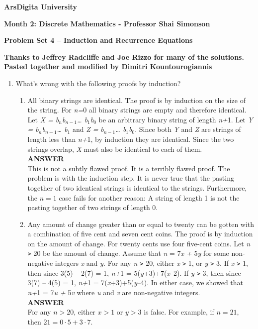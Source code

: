 \documentclass{article}
\begin{document}
\begin{center}
\textbf{ArsDigita University}

\textbf{Month 2: Discrete Mathematics - Professor Shai Simonson}

\textbf{Problem Set 4 -- Induction and Recurrence Equations}

\textbf{Thanks to Jeffrey Radcliffe and Joe Rizzo for many of the
solutions.\\
Pasted together and modified by Dimitri Kountourogiannis}

\end{center}

\begin{enumerate}
\item
What's wrong with the following proofs by induction?

\begin{enumerate}
\item
All binary strings are identical. The proof is by induction on the
size of the string. For \textit{n=}0 all binary strings are empty
and therefore identical. Let \textit{X =
b}$_{\mathit{n}}$\textit{b}$_{\mathit{n-1}}$\textit{\dots
b}$_{\mathit{1}}$\textit{b}$_{\mathit{0}}$ be an arbitrary binary
string of length \textit{n+}1. Let \textit{Y =
b}$_{\mathit{n}}$\textit{b}$_{\mathit{n-1}}$\textit{\dots
b}$_{\mathit{1}}$ and \textit{Z =}
\textit{b}$_{\mathit{n-1}}$\textit{\dots
b}$_{\mathit{1}}$\textit{b}$_{\mathit{0}}$. Since both \textit{Y}
and \textit{Z} are strings of length less than \textit{n+}1, by
induction they are identical. Since the two strings overlap,
\textit{X} must also be identical to each of them. \\
\textbf{ANSWER} \\
 This is not a subtly flawed proof. It is a terribly flawed proof.
 The problem is with the induction step. It is never true that the
 pasting together of two identical strings is identical to the
 strings. Furthermore, the $n=1$ case fails for another reason:
 A string of length 1 is not the pasting together of two strings
 of length 0.
\\

\item
Any amount of change greater than or equal to twenty can be gotten
with a combination of five cent and seven cent coins. The proof is
by induction on the amount of change. For twenty cents use four
five-cent coins. Let \textit{n} \texttt{>} 20 be the amount of
change. Assume that \textit{n} = 7\textit{x +} 5\textit{y} for
some non-negative integers \textit{x} and \textit{y.} For any
\textit{n \texttt{>}} 20, either \textit{x \texttt{>}} 1, or
\textit{y \texttt{>}} 3. If \textit{x \texttt{>}} 1, then since
3(5) -- 2(7) = 1, \textit{n+}1 = 5(\textit{y}+3)+7(\textit{x}--2).
If \textit{y \texttt{>}} 3, then since 3(7) -- 4(5) = 1,
\textit{n+}1 = 7(\textit{x}+3)+5(\textit{y}--4). In either case,
we showed that \textit{n+}1 = 7\textit{u +} 5\textit{v} where
\textit{u} and \textit{v} are non-negative integers. \\
\textbf{ANSWER} \\
For any  $n > 20$, either  $x > 1$  or $y > 3$
is false. For example, if $n=21$, then $21 = 0 \cdot 5 + 3 \cdot
7$.
\end{enumerate}


\end{enumerate}
\end{document}
